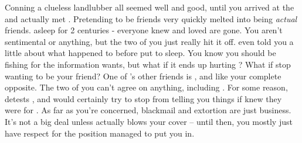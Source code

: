 \documentclass[char]{GL2020}
\begin{document}
Conning a clueless landlubber all seemed well and good, until you arrived at the \pSchool{} and actually met \cDisney{}. Pretending to be friends very quickly melted into being \emph{actual} friends. \cDisney{\They} \cDisney{\were} asleep for 2 centuries - everyone \cDisney{\they} knew and loved are gone. You aren't sentimental or anything, but the two of you just really hit it off. \cDisney{\They} \cDisney{\have} even told you a little about what happened to \cDisney{\them} before \cDisney{\they} \cDisney{\were} put to sleep. You know you should be fishing for the information \cWildCard{} wants, but what if it ends up hurting \cDisney{}? What if \cDisney{\they} stop\cDisney{\plural} wanting to be your friend? One of \cDisney{}'s other friends is  \cTechStar{\full}, and \cTechStar{\theyare} like your complete opposite. The two of you can't agree on anything, including \cWildCard{}. For some reason, \cTechStar{} detests \cWildCard{}, and would certainly try to stop \cDisney{} from telling you things if \cTechStar{\they} knew they were for \cWildCard{}. As far as you're concerned, blackmail and extortion are just business. It's not a big deal unless \cWildCard{} actually blows your cover – until then, you mostly just have respect for the position \cWildCard{\they} managed to put you in.
\end{document}
